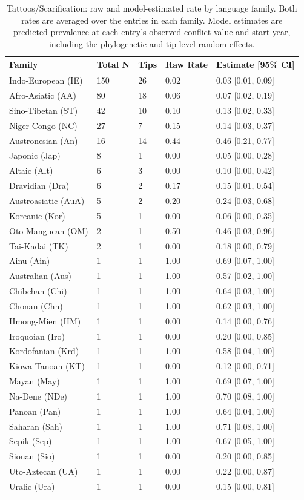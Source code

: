 \begin{table}[!ht]
\centering
\small
\caption{Tattoos/Scarification: raw and model-estimated rate by language family. Both rates are averaged over the entries in each family. Model estimates are predicted prevalence at each entry's observed conflict value and start year, including the phylogenetic and tip-level random effects.}
\label{tab:ext_tattoos_scarification_family}
\begin{tabular}{lllll}
\toprule
Family & Total N & Tips & Raw Rate & Estimate [95\% CI] \\
\midrule
Indo-European (IE) & 150 & 26 & 0.02 & 0.03 [0.01, 0.09] \\
Afro-Asiatic (AA) & 80 & 18 & 0.06 & 0.07 [0.02, 0.19] \\
Sino-Tibetan (ST) & 42 & 10 & 0.10 & 0.13 [0.02, 0.33] \\
Niger-Congo (NC) & 27 & 7 & 0.15 & 0.14 [0.03, 0.37] \\
Austronesian (An) & 16 & 14 & 0.44 & 0.46 [0.21, 0.77] \\
Japonic (Jap) & 8 & 1 & 0.00 & 0.05 [0.00, 0.28] \\
Altaic (Alt) & 6 & 3 & 0.00 & 0.10 [0.00, 0.42] \\
Dravidian (Dra) & 6 & 2 & 0.17 & 0.15 [0.01, 0.54] \\
Austroasiatic (AuA) & 5 & 2 & 0.20 & 0.24 [0.03, 0.68] \\
Koreanic (Kor) & 5 & 1 & 0.00 & 0.06 [0.00, 0.35] \\
Oto-Manguean (OM) & 2 & 1 & 0.50 & 0.46 [0.03, 0.96] \\
Tai-Kadai (TK) & 2 & 1 & 0.00 & 0.18 [0.00, 0.79] \\
Ainu (Ain) & 1 & 1 & 1.00 & 0.69 [0.07, 1.00] \\
Australian (Aus) & 1 & 1 & 1.00 & 0.57 [0.02, 1.00] \\
Chibchan (Chi) & 1 & 1 & 1.00 & 0.64 [0.03, 1.00] \\
Chonan (Chn) & 1 & 1 & 1.00 & 0.62 [0.03, 1.00] \\
Hmong-Mien (HM) & 1 & 1 & 0.00 & 0.14 [0.00, 0.76] \\
Iroquoian (Iro) & 1 & 1 & 0.00 & 0.20 [0.00, 0.85] \\
Kordofanian (Krd) & 1 & 1 & 1.00 & 0.58 [0.04, 1.00] \\
Kiowa-Tanoan (KT) & 1 & 1 & 0.00 & 0.12 [0.00, 0.71] \\
Mayan (May) & 1 & 1 & 1.00 & 0.69 [0.07, 1.00] \\
Na-Dene (NDe) & 1 & 1 & 1.00 & 0.70 [0.08, 1.00] \\
Panoan (Pan) & 1 & 1 & 1.00 & 0.64 [0.04, 1.00] \\
Saharan (Sah) & 1 & 1 & 1.00 & 0.71 [0.08, 1.00] \\
Sepik (Sep) & 1 & 1 & 1.00 & 0.67 [0.05, 1.00] \\
Siouan (Sio) & 1 & 1 & 0.00 & 0.20 [0.00, 0.85] \\
Uto-Aztecan (UA) & 1 & 1 & 0.00 & 0.22 [0.00, 0.87] \\
Uralic (Ura) & 1 & 1 & 0.00 & 0.15 [0.00, 0.81] \\
\bottomrule
\end{tabular}
\end{table}